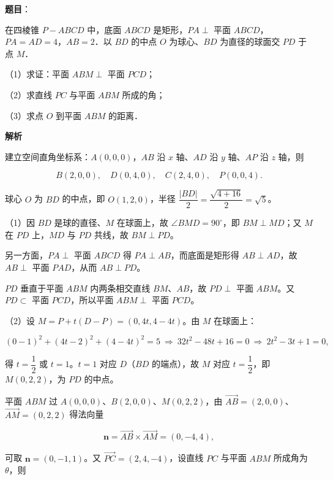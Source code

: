 \begin{answer}

\textbf{题目}：

在四棱锥 $P-ABCD$ 中，底面 $ABCD$ 是矩形，$PA\perp$ 平面 $ABCD$，$PA=AD=4$，$AB=2$．以 $BD$ 的中点 $O$ 为球心、$BD$ 为直径的球面交 $PD$ 于点 $M$．

（1）求证：平面 $ABM\perp$ 平面 $PCD$；

（2）求直线 $PC$ 与平面 $ABM$ 所成的角；

（3）求点 $O$ 到平面 $ABM$ 的距离．
\nopagebreak[4]
\begin{center}\end{center}
\nopagebreak[4]
\textbf{解析}

建立空间直角坐标系：$A(0,0,0)$，$AB$ 沿 $x$ 轴、$AD$ 沿 $y$ 轴、$AP$ 沿 $z$ 轴，则

\nopagebreak[4]
\[B(2,0,0),\quad D(0,4,0),\quad C(2,4,0),\quad P(0,0,4).\]

球心 $O$ 为 $BD$ 的中点，即 $O(1,2,0)$，半径 $\dfrac{|BD|}{2}=\dfrac{\sqrt{4+16}}{2}=\sqrt5$。

（1）因 $BD$ 是球的直径、$M$ 在球面上，故 $\angle BMD=90^\circ$，即 $BM\perp MD$；又 $M$ 在 $PD$ 上，$MD$ 与 $PD$ 共线，故 $BM\perp PD$。

另一方面，$PA\perp$ 平面 $ABCD$ 得 $PA\perp AB$，而底面是矩形得 $AB\perp AD$，故 $AB\perp$ 平面 $PAD$，从而 $AB\perp PD$。

$PD$ 垂直于平面 $ABM$ 内两条相交直线 $BM$、$AB$，故 $PD\perp$ 平面 $ABM$。又 $PD\subset$ 平面 $PCD$，所以平面 $ABM\perp$ 平面 $PCD$。

（2）设 $M=P+t(D-P)=(0,4t,4-4t)$。由 $M$ 在球面上：

\nopagebreak[4]
\[(0-1)^2+(4t-2)^2+(4-4t)^2=5\ \Longrightarrow\ 32t^2-48t+16=0\ \Longrightarrow\ 2t^2-3t+1=0,\]

得 $t=\dfrac12$ 或 $t=1$。$t=1$ 对应 $D$（$BD$ 的端点），故 $M$ 对应 $t=\dfrac12$，即 $M(0,2,2)$，为 $PD$ 的中点。

平面 $ABM$ 过 $A(0,0,0)$、$B(2,0,0)$、$M(0,2,2)$，由 $\overrightarrow{AB}=(2,0,0)$、$\overrightarrow{AM}=(0,2,2)$ 得法向量

\nopagebreak[4]
\[\boldsymbol n=\overrightarrow{AB}\times\overrightarrow{AM}=(0,-4,4),\]

可取 $\boldsymbol n=(0,-1,1)$。又 $\overrightarrow{PC}=(2,4,-4)$，设直线 $PC$ 与平面 $ABM$ 所成角为 $\theta$，则


\end{answer}
